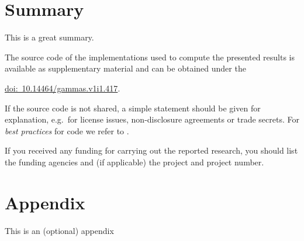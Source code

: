 \documentclass[usebibtex]{gammas}
\theoremstyle{definition}
\begin{document}
\section{Summary}
This is a great summary.

\begin{gammacode}
	The source code of the implementations used to compute the presented results is available as supplementary material and can be obtained under the
	\begin{center}
	 	\href{https://doi.org/10.14464/gammas.v1i1.417}{doi:~10.14464/gammas.v1i1.417}.
	\end{center}
	If the source code is not shared, a simple statement should be given for explanation, e.g.\ for license issues, non-disclosure agreements or trade secrets. For \emph{best practices} for code we refer to \cite{fehr2016best}.
\end{gammacode}

\begin{gammacknowledgement}
	If you received any funding for carrying out the reported research, you should list the funding agencies and (if applicable) the project and project number.
\end{gammacknowledgement}

\appendix

\section{Appendix}
This is an (optional) appendix

\setbib{\GAMMBIBFILENAME}
\end{document}
